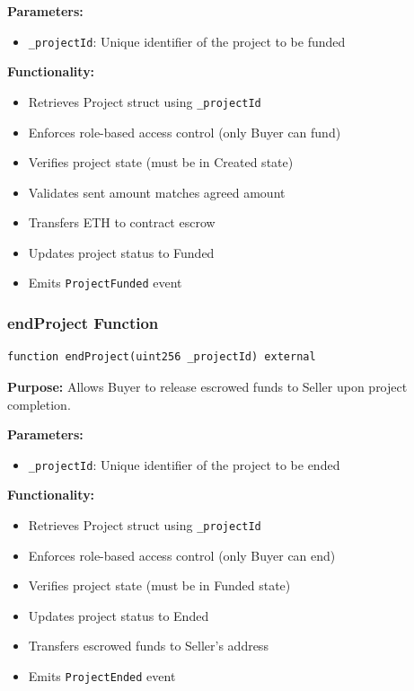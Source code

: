 \documentclass[12pt]{article}
\begin{document}
\textbf{Parameters:}
\begin{itemize}
    \item \texttt{\_projectId}: Unique identifier of the project to be funded
\end{itemize}

\textbf{Functionality:}
\begin{itemize}
    \item Retrieves Project struct using \texttt{\_projectId}
    \item Enforces role-based access control (only Buyer can fund)
    \item Verifies project state (must be in Created state)
    \item Validates sent amount matches agreed amount
    \item Transfers ETH to contract escrow
    \item Updates project status to Funded
    \item Emits \texttt{ProjectFunded} event
\end{itemize}

\subsubsection{endProject Function}
\begin{lstlisting}[language=Solidity]
function endProject(uint256 _projectId) external
\end{lstlisting}

\textbf{Purpose:} Allows Buyer to release escrowed funds to Seller upon project completion.

\textbf{Parameters:}
\begin{itemize}
    \item \texttt{\_projectId}: Unique identifier of the project to be ended
\end{itemize}

\textbf{Functionality:}
\begin{itemize}
    \item Retrieves Project struct using \texttt{\_projectId}
    \item Enforces role-based access control (only Buyer can end)
    \item Verifies project state (must be in Funded state)
    \item Updates project status to Ended
    \item Transfers escrowed funds to Seller's address
    \item Emits \texttt{ProjectEnded} event
\end{itemize}
\end{document}
